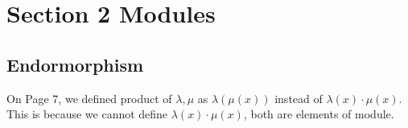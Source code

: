 \section{Section 2 Modules}

\subsection{Endormorphism}

On Page 7, we defined product of $\lambda, \mu$ as $\lambda(\mu(x))$ instead of $\lambda(x)\cdot\mu(x)$. This is because we cannot define $\lambda(x)\cdot\mu(x)$, both are elements of module. 
